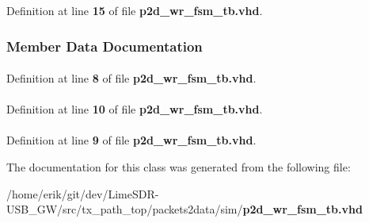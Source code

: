 Definition at line {\bf 15} of file {\bf p2d\+\_\+wr\+\_\+fsm\+\_\+tb.\+vhd}.



\subsubsection{Member Data Documentation}
\paragraph[{ieee}]{\hspace{0.3cm}{\ttfamily [Library]}}\label{classp2d__wr__fsm__tb_a0a6af6eef40212dbaf130d57ce711256}


Definition at line {\bf 8} of file {\bf p2d\+\_\+wr\+\_\+fsm\+\_\+tb.\+vhd}.

\paragraph[{numeric\+\_\+std}]{\hspace{0.3cm}{\ttfamily [Package]}}\label{classp2d__wr__fsm__tb_a2edc34402b573437d5f25fa90ba4013e}


Definition at line {\bf 10} of file {\bf p2d\+\_\+wr\+\_\+fsm\+\_\+tb.\+vhd}.

\paragraph[{std\+\_\+logic\+\_\+1164}]{\hspace{0.3cm}{\ttfamily [Package]}}\label{classp2d__wr__fsm__tb_acd03516902501cd1c7296a98e22c6fcb}


Definition at line {\bf 9} of file {\bf p2d\+\_\+wr\+\_\+fsm\+\_\+tb.\+vhd}.



The documentation for this class was generated from the following file\+:\begin{DoxyCompactItemize}
\item 
/home/erik/git/dev/\+Lime\+S\+D\+R-\/\+U\+S\+B\+\_\+\+G\+W/src/tx\+\_\+path\+\_\+top/packets2data/sim/{\bf p2d\+\_\+wr\+\_\+fsm\+\_\+tb.\+vhd}\end{DoxyCompactItemize}
